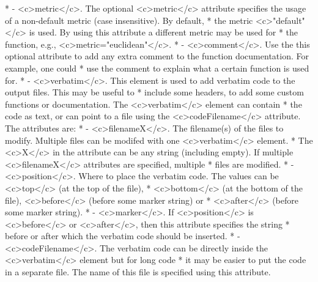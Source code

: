 \documentclass[10pt, a4paper]{article}
\begin{document}
\begin{itemize}
 *        - <c>metric</c>. The optional <c>metric</c> attribute specifies the usage of a non-default metric (case insensitive). By default,
 *          the metric <c>"default"</c> is used. By using this attribute a different metric may be used for
 *          the function, e.g., <c>metric="euclidean"</c>.
 *        - <c>comment</c>. Use the this optional attribute to add any extra comment to the function documentation. For example, one could
 *          use the comment to explain what a certain function is used for.
 *   - <c>verbatim</c>. This element is used to add verbatim code to the output files. This may be useful to
 *     include some headers, to add some custom functions or documentation. The <c>verbatim</c> element can contain
 *     the code as text, or can point to a file using the <c>codeFilename</c> attribute. The attributes are:
 *        - <c>filenameX</c>. The filename(s) of the files to modify. Multiple files can be modifed with one <c>verbatim</c> element.
 *        The <c>X</c> in the attribute can be any string (including empty). If multiple <c>filenameX</c> attributes are specified, multiple
 *        files are modified.
 *        - <c>position</c>. Where to place the verbatim code. The values can be <c>top</c> (at the top of the file), 
 *           <c>bottom</c> (at the bottom of the file), <c>before</c> (before some marker string) or
 *           <c>after</c> (before some marker string).
 *        - <c>marker</c>. If <c>position</c> is <c>before</c> or <c>after</c>, then this attribute specifies the string
 *           before or after which the verbatim code should be inserted.
 *        - <c>codeFilename</c>. The verbatim code can be directly inside the <c>verbatim</c> element but for long code
 *           it may be easier to put the code in a separate file. The name of this file is specified using this attribute.
 \end{itemize}
 
\end{document}
